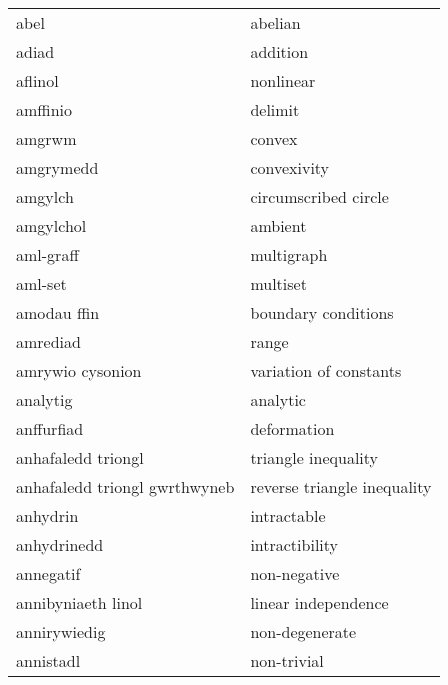 \begin{supertabular}{p{0.22\textwidth}p{0.22\textwidth}}
                            abel &                           abelian \\
                           adiad &                          addition \\
                         aflinol &                         nonlinear \\
                        amffinio &                           delimit \\
                          amgrwm &                            convex \\
                       amgrymedd &                       convexivity \\
                         amgylch &              circumscribed circle \\
                       amgylchol &                           ambient \\
                       aml-graff &                        multigraph \\
                         aml-set &                          multiset \\
                     amodau ffin &               boundary conditions \\
                        amrediad &                             range \\
                amrywio cysonion &            variation of constants \\
                        analytig &                          analytic \\
                      anffurfiad &                       deformation \\
              anhafaledd triongl &               triangle inequality \\
   anhafaledd triongl gwrthwyneb &       reverse triangle inequality \\
                        anhydrin &                       intractable \\
                     anhydrinedd &                    intractibility \\
                       annegatif &                      non-negative \\
              annibyniaeth linol &               linear independence \\
                    annirywiedig &                    non-degenerate \\
                       annistadl &                       non-trivial \\

\end{supertabular}
